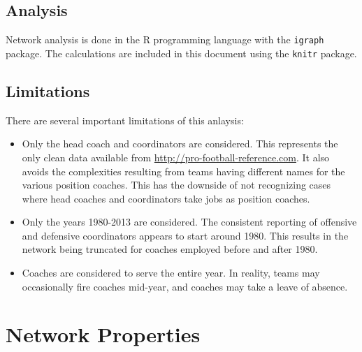 \documentclass[11pt]{article}\usepackage[]{graphicx}\usepackage[]{color}
\begin{document}
\subsection{Analysis}

Network analysis is done in the R programming language with the {\tt igraph}
package.  The calculations are included in this document using the {\tt knitr}
package.

\subsection{Limitations}

There are several important limitations of this anlaysis:

\begin{itemize}

\item Only the head coach and coordinators are considered.  This represents the
only clean data available from \url{http://pro-football-reference.com}.  It
also avoids the complexities resulting from teams having different names for
the various position coaches.  This has the downside of not recognizing cases
where head coaches and coordinators take jobs as position coaches.

\item Only the years 1980-2013 are considered.  The consistent reporting of
offensive and defensive coordinators appears to start around 1980.  This
results in the network being truncated for coaches employed before and after
1980.

\item Coaches are considered to serve the entire year.  In reality, teams may
occasionally fire coaches mid-year, and coaches may take a leave of absence.

\end{itemize}

\section{Network Properties}
\end{document}
